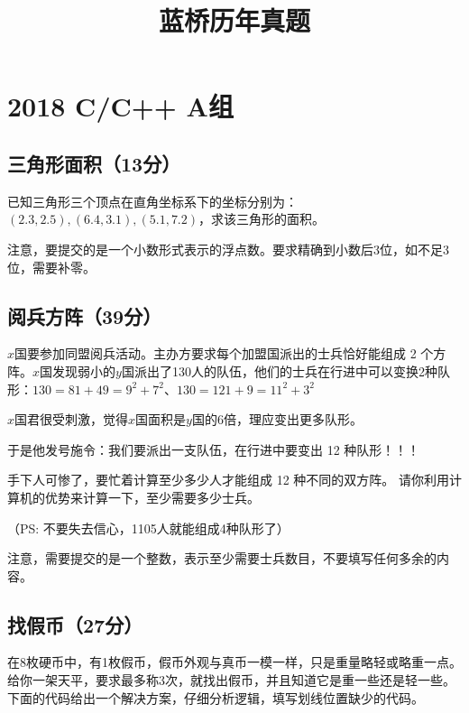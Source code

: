 \documentclass[a4paper, 12pt, twocolumn]{ctexart}
\title{蓝桥历年真题}
\author{}
\date{}
\begin{document}
	\maketitle
	\tableofcontents
	
	\newpage
	\section{2018 C/C++ A组}
	
	\subsection{三角形面积（13分）}
	
	已知三角形三个顶点在直角坐标系下的坐标分别为：$(2.3, 2.5),	(6.4, 3.1),	(5.1, 7.2)$，求该三角形的面积。
	
	注意，要提交的是一个小数形式表示的浮点数。要求精确到小数后3位，如不足3位，需要补零。
	
	\subsection{阅兵方阵（39分）}
	
	$x$国要参加同盟阅兵活动。主办方要求每个加盟国派出的士兵恰好能组成 2 个方阵。$x$国发现弱小的$y$国派出了130人的队伍，他们的士兵在行进中可以变换2种队形：$130 = 81 + 49 = 9^2 + 7^2$、$130 = 121 + 9 = 11^2 + 3^2$

	$x$国君很受刺激，觉得$x$国面积是$y$国的6倍，理应变出更多队形。
	
	于是他发号施令：我们要派出一支队伍，在行进中要变出 12 种队形！！！
	
	手下人可惨了，要忙着计算至少多少人才能组成 12 种不同的双方阵。
	请你利用计算机的优势来计算一下，至少需要多少士兵。
	
	（PS: 不要失去信心，1105人就能组成4种队形了）
	
	注意，需要提交的是一个整数，表示至少需要士兵数目，不要填写任何多余的内容。
	
	
	\subsection{找假币（27分）}
	
	在8枚硬币中，有1枚假币，假币外观与真币一模一样，只是重量略轻或略重一点。
	给你一架天平，要求最多称3次，就找出假币，并且知道它是重一些还是轻一些。
	下面的代码给出一个解决方案，仔细分析逻辑，填写划线位置缺少的代码。
	
\end{document}
